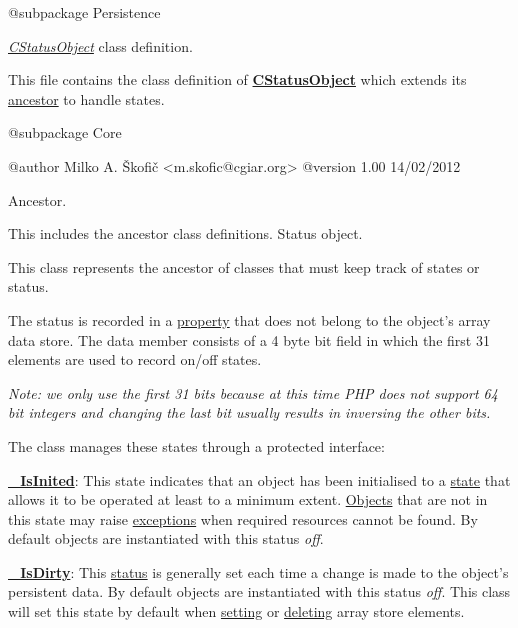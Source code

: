 \begin{DoxyVerb}    @subpackage     Persistence\end{DoxyVerb}


{\itshape \hyperlink{class_c_status_object}{C\-Status\-Object}\/} class definition.

This file contains the class definition of {\bfseries \hyperlink{class_c_status_object}{C\-Status\-Object}} which extends its \hyperlink{class_c_array_object}{ancestor} to handle states.

\begin{DoxyVerb}    @subpackage     Core

    @author         Milko A. Škofič <m.skofic@cgiar.org>
    @version        1.00 14/02/2012\end{DoxyVerb}


Ancestor.

This includes the ancestor class definitions. Status object.

This class represents the ancestor of classes that must keep track of states or status.

The status is recorded in a \hyperlink{}{property} that does not belong to the object's array data store. The data member consists of a 4 byte bit field in which the first 31 elements are used to record on/off states.

{\itshape Note\-: we only use the first 31 bits because at this time P\-H\-P does not support 64 bit integers and changing the last bit usually results in inversing the other bits.\/}

The class manages these states through a protected interface\-:


\begin{DoxyItemize}
\item {\bfseries \hyperlink{}{\-\_\-\-Is\-Inited}}\-: This state indicates that an object has been initialised to a \hyperlink{}{state} that allows it to be operated at least to a minimum extent. \hyperlink{namespace_objects}{Objects} that are not in this state may raise \hyperlink{}{exceptions} when required resources cannot be found. By default objects are instantiated with this status {\itshape off\/}. 
\item {\bfseries \hyperlink{}{\-\_\-\-Is\-Dirty}}\-: This \hyperlink{}{status} is generally set each time a change is made to the object's persistent data. By default objects are instantiated with this status {\itshape off\/}. This class will set this state by default when \hyperlink{}{setting} or \hyperlink{}{deleting} array store elements. 
\end{DoxyItemize}

